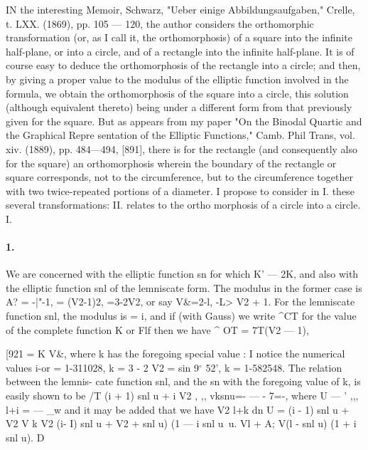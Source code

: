 \documentclass[11pt,a4paper]{book}
\begin{document}
{{{{IN  the  interesting  Memoir,  Schwarz,  "Ueber  einige  Abbildungsaufgaben,"  Crelle,
t.  LXX.  (1869),  pp.  105 --- 120,  the  author  considers  the  orthomorphic  transformation
(or,  as  I  call  it,  the  orthomorphosis)  of  a  square  into  the  infinite  half-plane,  or  into
a  circle,  and  of  a  rectangle  into  the  infinite  half-plane.  It  is  of  course  easy  to
deduce  the  orthomorphosis  of  the  rectangle  into  a  circle;  and  then,  by  giving  a
proper  value  to  the  modulus  of  the  elliptic  function  involved  in  the  formula,  we
obtain  the  orthomorphosis  of  the  square  into  a  circle,  this  solution  (although  equivalent
thereto)  being  under  a  different  form  from  that  previously  given  for  the  square.
But  as  appears  from  my  paper  "On  the  Binodal  Quartic  and  the  Graphical  Repre
sentation  of  the  Elliptic  Functions,"  Camb.  Phil  Trans,  vol.  xiv.  (1889),  pp.  484---494,
[891],  there  is  for  the  rectangle  (and  consequently  also  for  the  square)  an  orthomorphosis
wherein  the  boundary  of  the  rectangle  or  square  corresponds,  not  to  the  circumference,
but  to  the  circumference  together  with  two  twice-repeated  portions  of  a  diameter.
I  propose  to  consider  in  I.  these  several  transformations:  II.  relates  to  the  ortho
morphosis  of  a  circle  into  a  circle.
I.
\paragraph{1.} We  are  concerned  with  the  elliptic  function  sn  for  which  K'  ---  2K,  and  also
with  the  elliptic  function  snl  of  the  lemniscate  form.  The  modulus  in  the  former
case  is
A?  =  -|"-1,  =  (V2-1)2,  =3-2V2,  or  say  V\&=\/2-l,  -L> V2  +  1.
For  the   lemniscate   function    snl,   the    modulus    is    =  i,   and    if    (with    Gauss)   we   write
^CT   for   the    value   of  the   complete   function   K   or    Flf   then   we    have   ^ OT  =  7T(V2  ---  1),


[921
=  K  V\&,  where  k  has  the  foregoing  special  value  :  I  notice  the  numerical  values
i-or  =  1-311028,  k  =  3  -  2  V2  =  sin  9$^\circ$  52',  k  =  1-582548.  The  relation  between  the  lemnis-
cate  function  snl,  and  the  sn  with  the  foregoing  value  of  k,  is  easily  shown  to  be
/T  (i  +  1)  snl  u  +  i  V2        ,  ,,
vksnu=-  ---  -  7=-,  where    U  ---
'
,,,      l+i
=  ---  \_w
and  it  may  be  added  that  we  have
V2
l+k
dn  U  =
(i  -  1)  snl  u  +  V2  V      k
V2
(i-  I)  snl  u  +  V2
+  snl  u)  (1  ---  i  snl  u\
u.  Vl  +  A;  V(l  -  snl  u)  (1  +  i  snl  u).
D
}}}}
\end{document}
